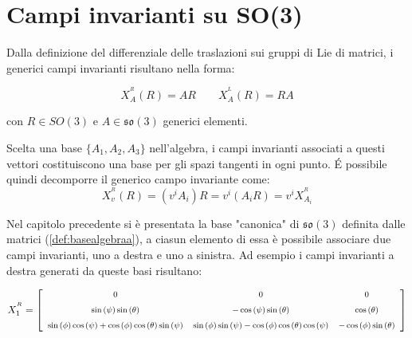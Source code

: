 \documentclass[11pt]{report}
\theoremstyle{plain}
\theoremstyle{definition}
\theoremstyle{remark}
\begin{document}

\section{Campi invarianti su SO(3)}
Dalla definizione del differenziale delle traslazioni sui gruppi di Lie di matrici, i generici campi invarianti risultano nella forma:

\begin{equation}
X_{A}^{^{R}} (R) =  A R \qquad X_{A}^{^{L}} (R) =  R A
\end{equation}

con $ R \in SO(3)$ e $ A \in \mathfrak{so(3)}$ generici elementi.

Scelta una base $ \lbrace A_{1},A_{2},A_{3} \rbrace$ nell'algebra, i campi invarianti associati a questi vettori costituiscono una base per gli spazi tangenti in ogni punto. É
possibile quindi decomporre il generico campo invariante come:
 \begin{displaymath}
 X_{v}^{^{R}} (R) =  (v^{i}A_{i}) R = v^{i} (A_{i} R) = v^{i}  X_{A_{i}}^{^{R}}
 \end{displaymath}

Nel capitolo precedente si è presentata la base "canonica" di $\mathfrak{so(3)}$ definita dalle matrici (\ref{def:basealgebraa}), a ciasun elemento di essa è possibile associare due campi invarianti, uno a destra e uno a sinistra. Ad esempio i campi invarianti a destra generati da queste basi risultano:

\begin{displaymath}\footnotesize
X_{1}^{^{R}} = \left[ \begin {array}{ccc} 0&0&0\\ \noalign{\medskip}\sin \left( \psi \right) \sin \left( \theta \right) &-\cos \left( \psi \right) \sin \left( \theta \right) &\cos \left( \theta \right) \\ \noalign{\medskip}\sin \left( \phi \right) \cos \left( \psi \right) +\cos \left( \phi \right) \cos \left( \theta \right) \sin \left( \psi \right) &\sin \left( \phi \right) \sin \left( \psi \right) -\cos \left( \phi \right) \cos \left( \theta \right) \cos \left( \psi \right) &-\cos \left( \phi \right) \sin \left( \theta \right) \end {array} \right]
\end{displaymath}
\end{document}
